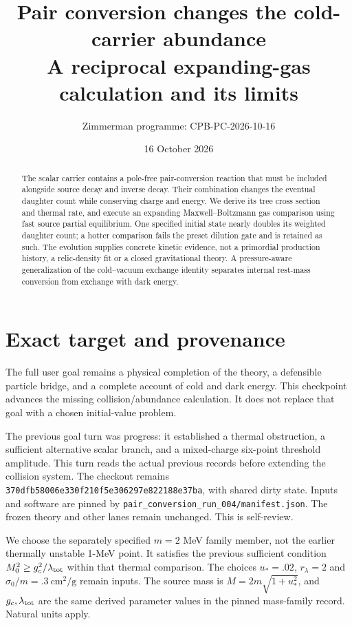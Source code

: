 \documentclass[11pt]{article}
\title{Pair conversion changes the cold-carrier abundance\\
A reciprocal expanding-gas calculation and its limits}
\author{Zimmerman programme: CPB-PC-2026-10-16}
\date{16 October 2026}
\begin{document}
\maketitle
\begin{abstract}
The scalar carrier contains a pole-free pair-conversion reaction that must
be included alongside source decay and inverse decay. Their combination
changes the eventual daughter count while conserving charge and energy.
We derive its tree cross section and thermal rate, and execute an expanding
Maxwell--Boltzmann gas comparison using fast source partial equilibrium.
One specified initial state nearly doubles its weighted daughter count;
a hotter comparison fails the preset dilution gate and is retained as such.
The evolution supplies concrete kinetic evidence, not a primordial production
history, a relic-density fit or a closed gravitational theory. A pressure-aware
generalization of the cold--vacuum exchange identity separates internal
rest-mass conversion from exchange with dark energy.
\end{abstract}

\section{Exact target and provenance}
The full user goal remains a physical completion of the theory, a defensible
particle bridge, and a complete account of cold and dark energy. This
checkpoint advances the missing collision/abundance calculation. It does
not replace that goal with a chosen initial-value problem.

The previous goal turn was progress: it established a thermal obstruction,
a sufficient alternative scalar branch, and a mixed-charge six-point
threshold amplitude. This turn reads the actual previous records before
extending the collision system. The checkout remains
\texttt{370dfb58006e330f210f5e306297e822188e37ba}, with shared dirty state.
Inputs and software are pinned by
\texttt{pair\_conversion\_run\_004/manifest.json}. The frozen theory and
other lanes remain unchanged. This is self-review.

We choose the separately specified $m=2$ MeV family member, not the earlier
thermally unstable 1-MeV point. It satisfies the previous sufficient
condition $M_0^2\ge g_c^2/\lambda_{\rm tot}$ within that thermal comparison.
The choices $u_*=.02$, $r_\lambda=2$ and
$\sigma_0/m=.3\ \mathrm{cm^2/g}$ remain inputs. The source mass is
$M=2m\sqrt{1+u_*^2}$, and $g_c,\lambda_{\rm tot}$ are the same derived
parameter values in the pinned mass-family record. Natural units apply.
\end{document}
